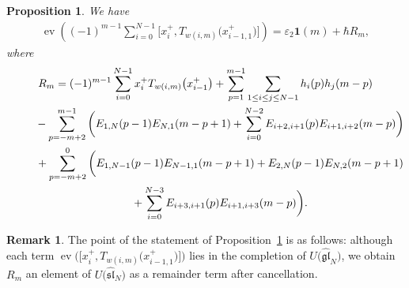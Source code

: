 \documentclass[11pt]{article}
\newtheorem{prop}[thm]{Proposition}
\theoremstyle{definition}
\newtheorem{rem}[thm]{Remark}
\numberwithin{equation}{section}
\DeclareMathOperator{\ev}{ev}
\newcommand{\ve}{\varepsilon}
\newcommand{\gl}{\mathfrak{gl}}
\newcommand{\affsl}{\hat{\mathfrak{sl}}_N}
\newcommand{\bfid}{\mathbf{1}}
\begin{document}
\begin{prop}\label{prop:Heisenberg}
We have
\begin{gather}
\ev\left( (-1)^{m-1} \sum_{i=0}^{N-1} \big[x_{i}^+, T_{w(i,m)}\big(x_{i-1,1}^+\big)\big] \right) = \ve_2 \bfid(m) + \hbar R_m, \label{eq:Heisenberg}
\end{gather}
where
\begin{gather*}
R_m= (-1)^{m-1}\sum_{i=0}^{N-1} x_{i}^+ T_{w(i,m)}\big(x_{i-1}^+\big) + \sum_{p=1}^{m-1} \sum_{1 \leq i \leq j \leq N-1} h_i(p)h_j(m-p) \\
\hphantom{R_m=}{} - \sum_{p=-m+2}^{m-1} \bigg( E_{1,N}(p-1)E_{N,1}(m-p+1) + \sum_{i=0}^{N-2} E_{i+2,i+1}(p)E_{i+1,i+2}(m-p) \bigg) \\
\hphantom{R_m=}{} + \sum_{p=-m+2}^{0} \bigg( E_{1,N-1}(p-1)E_{N-1,1}(m-p+1) +E_{2,N}(p-1)E_{N,2}(m-p+1) \\
\hphantom{R_m=}{} + \sum_{i=0}^{N-3} E_{i+3,i+1}(p)E_{i+1,i+3}(m-p) \bigg).
\end{gather*}
\end{prop}

\begin{rem}The point of the statement of Proposition~\ref{prop:Heisenberg} is as follows: although each term $\ev\big(\big[x_{i}^+, T_{w(i,m)}\big(x_{i-1,1}^+\big)\big]\big)$ lies in the completion of $U\big(\hat{\gl}_N\big)$, we obtain $R_m$ an element of $U\big(\affsl\big)$ as a remainder term after cancellation.
\end{rem}
\end{document}
